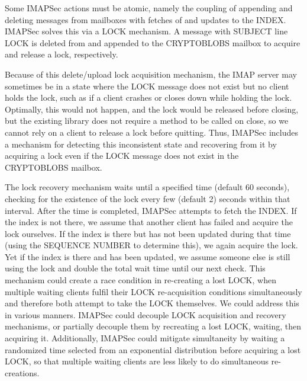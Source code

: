 \documentclass[pageno]{jpaper}
\newcommand{\project}{IMAPSec }
\begin{document}
Some \project actions must be atomic, namely the coupling of appending and deleting messages from mailboxes with fetches of and updates to the INDEX. \project solves this via a LOCK mechanism. A message with SUBJECT line LOCK is deleted from and appended to the CRYPTOBLOBS mailbox to acquire and release a lock, respectively.

Because of this delete/upload lock acquisition mechanism, the IMAP server may sometimes be in a state where the LOCK message does not exist but no client holds the lock, such as if a client crashes or closes down while holding the lock. Optimally, this would not happen, and the lock would be released before closing, but the existing library does not require a method to be called on close, so we cannot rely on a client to release a lock before quitting. Thus, \project includes a mechanism for detecting this inconsistent state and recovering from it by acquiring a lock even if the LOCK message does not exist in the CRYPTOBLOBS mailbox.

The lock recovery mechanism waits until a specified time (default 60 seconds), checking for the existence of the lock every few (default 2) seconds within that interval. After the time is completed, \project attempts to fetch the INDEX. If the index is not there, we assume that another client has failed and acquire the lock ourselves. If the index is there but has not been updated during that time (using the SEQUENCE NUMBER to determine this), we again acquire the lock. Yet if the index is there and has been updated, we assume someone else is still using the lock and double the total wait time until our next check. This mechanism could create a race condition in re-creating a lost LOCK, when multiple waiting clients fulfil their LOCK re-acquisition conditions simultaneously and therefore both attempt to take the LOCK themselves. We could address this in various manners. \project could decouple LOCK acquisition and recovery mechanisms, or partially decouple them by recreating a lost LOCK, waiting, then acquiring it. Additionally, \project could mitigate simultaneity by waiting a randomized time selected from an exponential distribution before acquiring a lost LOCK, so that multiple waiting clients are less likely to do simultaneous re-creations.
\end{document}
